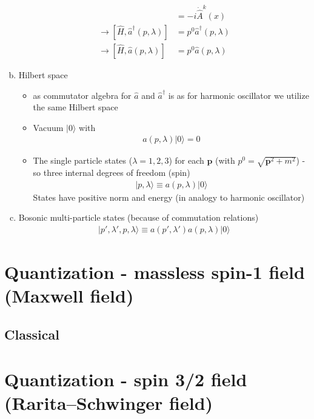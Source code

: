 \documentclass[10pt,a4paper]{report}
\theoremstyle{definition}
\begin{document}
\begin{enumerate}[a)]
\begin{align}
[\hat{H},\hat{A}^k(x)]
&=-i\dot{\hat{A}}^k(x)\\
\rightarrow[\hat{H},\hat{a}^\dagger(p,\lambda)]
&=p^0\hat{a}^\dagger(p,\lambda)\\
\rightarrow[\hat{H},\hat{a}(p,\lambda)]
&=p^0\hat{a}(p,\lambda)
\end{align}

\item Hilbert space
\begin{itemize}
\item as commutator algebra for $\hat{a}$ and $\hat{a}^\dagger$ is as for harmonic oscillator we utilize the same Hilbert space 
\item Vacuum $|0\rangle$ with
\begin{align}
a(p,\lambda)|0\rangle=0
\end{align}
\item The single particle states ($\lambda=1, 2, 3$) for each $\mathbf{p}$ (with $p^0=\sqrt{\mathbf{p}^2+m^2}$) - so three internal degrees of freedom (spin)
\begin{align}
|p,\lambda\rangle\equiv a(p,\lambda)|0\rangle
\end{align}
States have positive norm and energy (in analogy to harmonic oscillator)
\end{itemize}
\item Bosonic multi-particle states (because of commutation relations)
\begin{align}
|p',\lambda',p,\lambda\rangle\equiv a(p',\lambda')a(p,\lambda)|0\rangle
\end{align}

\end{enumerate}

\newpage
\section{Quantization - massless spin-1 field (Maxwell field)}
\subsection{Classical}

\newpage
\section{Quantization - spin 3/2 field (Rarita–Schwinger field)}
\end{document}

